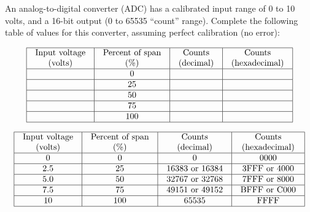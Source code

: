 

An analog-to-digital converter (ADC) has a calibrated input range of 0 to 10 volts, and a 16-bit output (0 to 65535 ``count'' range).  Complete the following table of values for this converter, assuming perfect calibration (no error):


$$\vbox{\offinterlineskip
\halign{\strut
\vrule \quad\hfil # \ \hfil & 
\vrule \quad\hfil # \ \hfil & 
\vrule \quad\hfil # \ \hfil & 
\vrule \quad\hfil # \ \hfil \vrule \cr
\noalign{\hrule}
%
Input voltage & Percent of span & Counts & Counts \cr
%
(volts) & (\%) & (decimal) & (hexadecimal) \cr
%
\noalign{\hrule}
%
 & 0 &  & \cr
%
\noalign{\hrule}
%
 & 25 &  & \cr
%
\noalign{\hrule}
%
 & 50 &  & \cr
%
\noalign{\hrule}
%
 & 75 &  &  \cr
%
\noalign{\hrule}
%
 & 100 &  &  \cr
%
\noalign{\hrule}
} %
}$$ %








$$\vbox{\offinterlineskip
\halign{\strut
\vrule \quad\hfil # \ \hfil & 
\vrule \quad\hfil # \ \hfil & 
\vrule \quad\hfil # \ \hfil & 
\vrule \quad\hfil # \ \hfil \vrule \cr
\noalign{\hrule}
%
Input voltage & Percent of span & Counts & Counts \cr
%
(volts) & (\%) & (decimal) & (hexadecimal) \cr
%
\noalign{\hrule}
%
0 & 0 & 0 & 0000 \cr
%
\noalign{\hrule}
%
2.5 & 25 & 16383 or 16384 & 3FFF or 4000 \cr
%
\noalign{\hrule}
%
5.0 & 50 & 32767 or 32768 & 7FFF or 8000 \cr
%
\noalign{\hrule}
%
7.5 & 75 & 49151 or 49152 & BFFF or C000 \cr
%
\noalign{\hrule}
%
10 & 100 & 65535 & FFFF \cr
%
\noalign{\hrule}
} %
}$$ %











